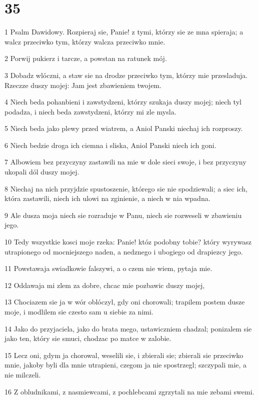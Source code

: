 \chapter{35}

\par 1 Psalm Dawidowy. Rozpieraj sie, Panie! z tymi, którzy sie ze mna spieraja; a walcz przeciwko tym, którzy walcza przeciwko mnie.
\par 2 Porwij pukierz i tarcze, a powstan na ratunek mój.
\par 3 Dobadz wlóczni, a staw sie na drodze przeciwko tym, którzy mie przesladuja. Rzeczze duszy mojej: Jam jest zbawieniem twojem.
\par 4 Niech beda pohanbieni i zawstydzeni, którzy szukaja duszy mojej; niech tyl podadza, i niech beda zawstydzeni, którzy mi zle mysla.
\par 5 Niech beda jako plewy przed wiatrem, a Aniol Panski niechaj ich rozproszy.
\par 6 Niech bedzie droga ich ciemna i sliska, Aniol Panski niech ich goni.
\par 7 Albowiem bez przyczyny zastawili na mie w dole sieci swoje, i bez przyczyny ukopali dól duszy mojej.
\par 8 Niechaj na nich przyjdzie spustoszenie, którego sie nie spodziewali; a siec ich, która zastawili, niech ich ulowi na zginienie, a niech w nia wpadna.
\par 9 Ale dusza moja niech sie rozraduje w Panu, niech sie rozweseli w zbawieniu jego.
\par 10 Tedy wszystkie kosci moje rzeka: Panie! któz podobny tobie? który wyrywasz utrapionego od mocniejszego naden, a nedznego i ubogiego od drapiezcy jego.
\par 11 Powstawaja swiadkowie falszywi, a o czem nie wiem, pytaja mie.
\par 12 Oddawaja mi zlem za dobre, chcac mie pozbawic duszy mojej,
\par 13 Chociazem sie ja w wór oblóczyl, gdy oni chorowali; trapilem postem dusze moje, i modlilem sie czesto sam u siebie za nimi.
\par 14 Jako do przyjaciela, jako do brata mego, ustawiczniem chadzal; ponizalem sie jako ten, który sie smuci, chodzac po matce w zalobie.
\par 15 Lecz oni, gdym ja chorowal, weselili sie, i zbierali sie; zbierali sie przeciwko mnie, jakoby byli dla mnie utrapieni, czegom ja nie spostrzegl; szczypali mie, a nie milczeli.
\par 16 Z obludnikami, z nasmiewcami, z pochlebcami zgrzytali na mie zebami swemi.
